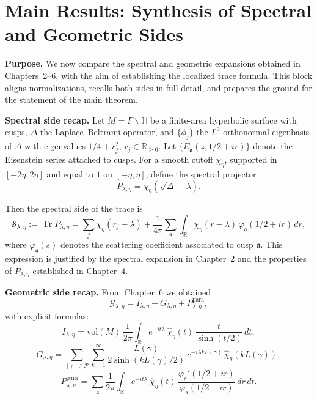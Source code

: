 
\section{Main Results: Synthesis of Spectral and Geometric Sides}

\noindent\textbf{Purpose.}
We now compare the spectral and geometric expansions obtained in Chapters~2–6, with the aim of establishing the localized trace formula.  
This block aligns normalizations, recalls both sides in full detail, and prepares the ground for the statement of the main theorem.

\medskip

\noindent\textbf{Spectral side recap.}
Let $M = \Gamma\backslash\mathbb{H}$ be a finite-area hyperbolic surface with cusps, $\Delta$ the Laplace--Beltrami operator, and $\{\phi_j\}$ the $L^2$-orthonormal eigenbasis of $\Delta$ with eigenvalues $1/4 + r_j^2$, $r_j \in \mathbb{R}_{\ge 0}$.  
Let $\{E_\mathfrak{a}(z,1/2+ir)\}$ denote the Eisenstein series attached to cusps.  
For a smooth cutoff $\chi_\eta$, supported in $[-2\eta,2\eta]$ and equal to $1$ on $[-\eta,\eta]$, define the spectral projector
\[
  P_{\lambda,\eta} = \chi_\eta(\sqrt{\Delta} - \lambda).
\]

Then the spectral side of the trace is
\[
  \mathcal{S}_{\lambda,\eta}
  := \operatorname{Tr} P_{\lambda,\eta}
  = \sum_{j} \chi_\eta(r_j - \lambda)
  + \frac{1}{4\pi}\sum_{\mathfrak{a}} \int_{\mathbb{R}}
    \chi_\eta(r - \lambda)\,\varphi_\mathfrak{a}(1/2+ir)\, dr,
\]
where $\varphi_\mathfrak{a}(s)$ denotes the scattering coefficient associated to cusp $\mathfrak{a}$.  
This expression is justified by the spectral expansion in Chapter~2 and the properties of $P_{\lambda,\eta}$ established in Chapter~4.

\medskip

\noindent\textbf{Geometric side recap.}
From Chapter~6 we obtained
\[
  \mathcal{G}_{\lambda,\eta}
  = I_{\lambda,\eta} + G_{\lambda,\eta} + P_{\lambda,\eta}^{\mathrm{para}},
\]
with explicit formulas:
\[
  I_{\lambda,\eta}
  = \mathrm{vol}(M)\, \frac{1}{2\pi}\int_{\mathbb{R}}
    e^{-it\lambda}\,\widehat{\chi}_\eta(t)\,
    \frac{t}{\sinh(t/2)}\, dt,
\]
\[
  G_{\lambda,\eta}
  = \sum_{[\gamma]\in \mathcal{P}}\sum_{k=1}^\infty
    \frac{L(\gamma)}{2\sinh(kL(\gamma)/2)}\,
    e^{-i\lambda kL(\gamma)}\, \widehat{\chi}_\eta(kL(\gamma)),
\]
\[
  P_{\lambda,\eta}^{\mathrm{para}}
  = \sum_{\mathfrak{a}} \frac{1}{2\pi}\int_{\mathbb{R}}
    e^{-it\lambda}\,\widehat{\chi}_\eta(t)\,
    \frac{\varphi_\mathfrak{a}'(1/2+ir)}{\varphi_\mathfrak{a}(1/2+ir)}\, dr\, dt.
\]

